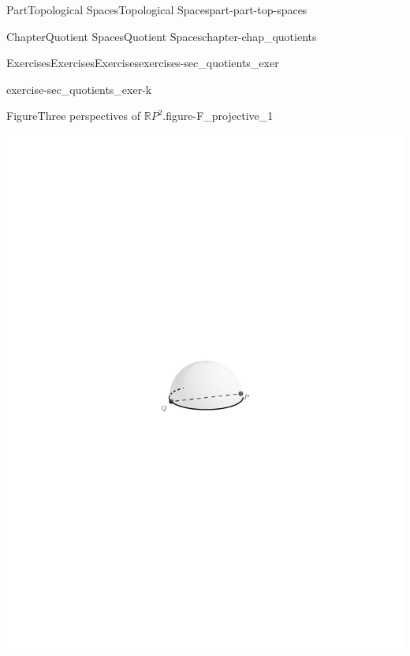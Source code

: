 \documentclass[oneside,10pt,]{book}
\numberwithin{equation}{chapter}
\begin{document}
\begin{partptx}{Part}{Topological Spaces}{}{Topological Spaces}{}{}{part-part-top-spaces}
\begin{chapterptx}{Chapter}{Quotient Spaces}{}{Quotient Spaces}{}{}{chapter-chap_quotients}
\begin{exercises-section}{Exercises}{Exercises}{}{Exercises}{}{}{exercises-sec_quotients_exer}
\begin{divisionexercise}{10}{}{}{exercise-sec_quotients_exer-k}
\begin{enumerate}[font=\bfseries,label=(\alph*),ref=\alph*]
\begin{figureptx}{Figure}{Three perspectives of \(\mathbb{R}P^2\).}{figure-F_projective_1}{}
\begin{sidebyside}{3}{0}{0}{0}
\begin{sbspanel}{0.4}
\includegraphics[width=\linewidth]{external/projective_1.pdf}
\end{sbspanel}%
\begin{sbspanel}{0.3}%

\end{sbspanel}
\end{sidebyside}
\end{figureptx}
\end{enumerate}
\end{divisionexercise}
\end{exercises-section}
\end{chapterptx}
\end{partptx}
\end{document}
